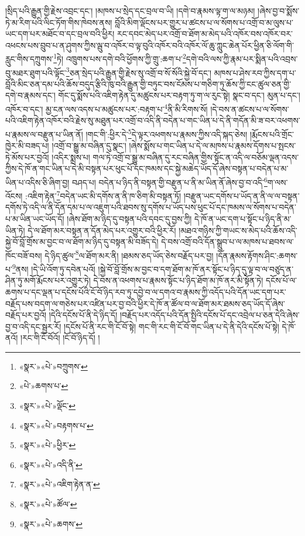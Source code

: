 །སྲིད་པའི་རྒྱུན་གྱི་རྗེས་འབྲང་དང་། །མཁས་པ་སྲེད་དང་བྲལ་བ་ཡི། །དགེ་བ་རྣམས་ལྟ་ག་ལ་མཉམ། །ཞེས་བྱ་བ་སྨོས་ཏེ་མ་རིག་པའི་ལིང་ཏོག་གིས་ཁེབས་ནས། བློའི་མིག་ལྡོངས་པར་གྱུར་པ་ཚངས་པ་ལ་སོགས་པ་འགྲོ་བ་མ་ལུས་པ་ཡང་དག་པར་མཐོང་བ་དང་བྲལ་བའི་ཕྱིར། རང་དབང་མེད་པར་འགྲོ་བ་ཐོག་མ་མེད་པའི་འཁོར་བས་འཁོར་བར་འཕངས་པས་བྲུབ་པ་ན་ཤུགས་ཀྱིས་ལྦུ་བ་འཁོར་བ་ལྟ་བུའི་འཁོར་བའི་འཁོར་ལོ་ཆུ་ཀླུང་ཆེན་པོར་ཕྱིན་ཅི་ལོག་གི་རླུང་གིས་དཀྲུགས་\footnote{«སྣར་»«པེ་»བཀྲུགས་}ཏེ། འཁྲུགས་པས་དགེ་བའི་ཕྱོགས་ཀྱི་གྲུ་:ཆག་པ་\footnote{«པེ་»ཆགས་པ་}དགེ་བའི་ལས་ཀྱི་རྣམ་པར་སྨིན་པའི་འབྲས་བུ་མཐར་ཐུག་པའི་ལྟོང་\footnote{«སྣར་»«པེ་»ལྡོང་}ཅན་སྲེད་པའི་རྒྱུན་གྱི་རྗེས་སུ་འགྲོ་བ་སོ་སོའི་སྐྱེ་བོ་དང་། མཁས་པ་ཤེས་རབ་ཀྱིས་དག་པ་བློའི་མིང་ཅན་དམ་པའི་ཆོས་བདུད་རྩིའི་ཁུ་བའི་རྒྱུན་གྱི་བཏུང་བས་ངོམས་པ་གཅིག་ཏུ་ཆོས་ཀྱི་ངང་ཚུལ་ཅན་གྱི་དགེ་བ་རྣམས་དང་། གོང་དུ་སྨོས་པའི་འཇིག་རྟེན་དུ་མཚུངས་པར་བརྟག་ཏུ་ག་ལ་རུང་སྟེ། སྣང་བ་དང་། མུན་པ་དང་། འཁོར་བ་དང་། མྱ་ངན་ལས་འདས་པ་མཚུངས་པར་:བརྟག་པ་\footnote{«སྣར་»«པེ་»བརྟགས་པ་}ནི་མི་རིགས་སོ། །དེ་བས་ན་ཚངས་པ་ལ་སོགས་པའི་འཇིག་རྟེན་འཁོར་བའི་རྗེས་སུ་མཐུན་པར་འགྲོ་བ་འདི་ནི་བདེན་པ་གང་ཡིན་པ་དེ་ནི་གདོན་མི་ཟ་བར་འཕགས་པ་རྣམས་ལ་བརྫུན་པ་ཡིན་ནོ། །གང་གི་:ཕྱིར་དེ་\footnote{«སྣར་»«པེ་»ཕྱིར་}དེ་ལྟར་འཕགས་པ་རྣམས་ཀྱིས་འདི་སྐད་ཅེས། །རྨོངས་པའི་གྲོང་ཁྱེར་མི་བཟད་པ། །འགྲོ་བ་སྒྱུ་མ་བཞིན་དུ་སྣང་། །ཞེས་སྨོས་པ་གང་ཡིན་པ་དེ་ལ་མཁས་པ་རྣམས་དོགས་པ་སྤངས་ཏེ་མོས་པར་བྱའོ། །འདིར་སྨྲས་པ། གལ་ཏེ་འགྲོ་བ་སྒྱུ་མ་བཞིན་དུ་རང་བཞིན་གྱིས་སྟོང་ན་འདི་ལ་བཅོམ་ལྡན་འདས་ཀྱིས་དེ་ཁོ་ན་གང་ཡིན་པ་དེ་མི་བསྟན་པར་ཕུང་པོ་དང་ཁམས་དང་སྐྱེ་མཆེད་ཡོད་དོ་ཞེས་བསྟན་པ་བདེན་པ་མ་ཡིན་པ་འདིས་ཅི་ཞིག་བྱ། བཤད་པ། བདེན་པ་ཉིད་ནི་བསྟན་གྱི་བརྫུན་པ་ནི་མ་ཡིན་ནོ་ཞེས་བྱ་བ་འདི་\footnote{«སྣར་»«པེ་»འདི་ནི་}ག་ལས་འོངས། :འཇིག་རྟེན་\footnote{«སྣར་»«པེ་»འཇིག་རྟེན་ན་}བདེན་ཡང་མི་དགོས་ན་ནི་ཁ་ཅིག་མི་བསྟན་ཏོ། །བརྫུན་ཡང་དགོས་པ་ཡོད་ན་ནི་ལ་ལ་བསྟན་དགོས་ཏེ་འདི་ལ་ནི་དོན་དམ་པ་ལ་འཇུག་པའི་ཐབས་སུ་དགོས་པ་ཡོད་པས་ཕུང་པོ་དང་ཁམས་ལ་སོགས་པ་བདེན་པ་མ་ཡིན་ཡང་ཡོད་དོ། །ཞེས་ཐོག་མ་ཉིད་དུ་བསྟན་པའི་དབང་དུ་བྱས་ཀྱི། དེ་ཁོ་ན་ཡང་དག་པ་སྟོང་པ་ཉིད་ནི་མ་ཡིན་ཏེ། དེ་ལ་ཐོག་མར་བསྟན་ན་དོན་མེད་པར་འགྱུར་བའི་ཕྱིར་རོ། །མཐའ་གཉིས་ཀྱི་གཡང་ས་མེད་པའི་ཆོས་འདི་སྐྱེ་བོ་བློ་གྲོས་མ་བྱང་བ་ལ་ཐོག་མ་ཉིད་དུ་བསྟན་མི་བཟོད་དེ། དེ་བས་འགྲོ་བའི་དོན་སྒྲུབ་པ་ལ་མཁས་པ་ཐབས་ལ་ཁོང་བཟོ་བས། དེ་ཉིད་ཚུལ་\footnote{«སྣར་»«པེ་»ཚོལ་}ལ་ཐོག་མར་ནི། །ཐམས་ཅད་ཡོད་ཅེས་བརྗོད་པར་བྱ། །དོན་རྣམས་རྟོགས་ཤིང་:ཆགས་པ་\footnote{«སྣར་»«པེ་»ཆགས་}ནས། །དེ་ཡི་འོག་ཏུ་དབེན་པའོ། །སྐྱེ་བོ་བློ་གྲོས་མ་བྱང་བ་དག་ཐོག་མ་ཁོ་ནར་སྟོང་པ་ཉིད་དུ་ལྟ་བ་ལ་བཙུད་ན་ཤིན་ཏུ་མགོ་རྨོངས་པར་འགྱུར་ཏེ། དེ་བས་ན་འཕགས་པ་རྣམས་སྟོང་པ་ཉིད་ཐོག་མ་ཁོ་ནར་མི་སྟོན་ཏེ། དངོས་པོ་ལ་ཆགས་པ་དང་ལྡན་པ་དངོས་པོའི་ངོ་བོ་ཉིད་རབ་ཏུ་དབྱེ་བ་ལ་དགའ་བ་རྣམས་ཀྱི་འདོད་པའི་དོན་ཡང་དག་པར་བརྗོད་པས་བདག་ལ་གཅེས་པར་འཛིན་པར་བྱ་བའི་ཕྱིར་དེ་ཁོ་ན་ཚོལ་བ་ལ་ཐོག་མར་ཐམས་ཅད་ཡོད་དོ་ཞེས་བརྗོད་པར་བྱའོ། །དེའི་དངོས་པོ་ནི་དེ་ཉིད་དོ། །བརྗོད་པར་འདོད་པའི་དོན་སྤྱིའི་དངོས་པོ་དང་འབྲེལ་པ་ཅན་དེའི་ཞེས་བྱ་བ་འདི་དང་སྦྱར་རོ། །དངོས་པོ་ནི་རང་གི་ངོ་བོ་སྟེ། གང་གི་རང་གི་ངོ་བོ་གང་ཡིན་པ་དེ་ནི་དེའི་དངོས་པོ་སྟེ། དེ་ཁོ་ནའོ། །རང་གི་ངོ་བོའོ། །ངོ་བོ་ཉིད་དོ། །
